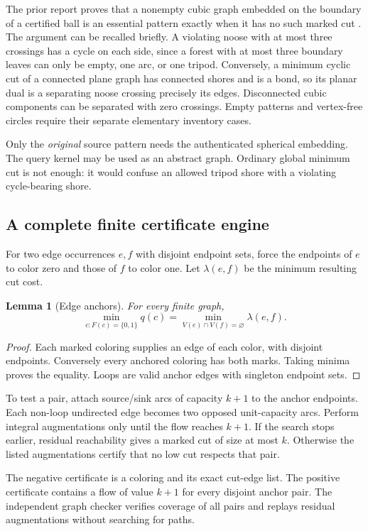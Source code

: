 \documentclass[11pt]{article}
\newtheorem{lemma}[theorem]{Lemma}
\theoremstyle{remark}\newtheorem{remark}[theorem]{Remark}
\begin{document}
The prior report proves that a nonempty cubic graph embedded on the boundary of a certified ball is an essential pattern exactly when it has no such marked cut \cite{fourcopy}. The argument can be recalled briefly. A violating noose with at most three crossings has a cycle on each side, since a forest with at most three boundary leaves can only be empty, one arc, or one tripod. Conversely, a minimum cyclic cut of a connected plane graph has connected shores and is a bond, so its planar dual is a separating noose crossing precisely its edges. Disconnected cubic components can be separated with zero crossings. Empty patterns and vertex-free circles require their separate elementary inventory cases.

Only the \emph{original} source pattern needs the authenticated spherical embedding. The query kernel may be used as an abstract graph. Ordinary global minimum cut is not enough: it would confuse an allowed tripod shore with a violating cycle-bearing shore.

\subsection{A complete finite certificate engine}
For two edge occurrences $e,f$ with disjoint endpoint sets, force the endpoints of $e$ to color zero and those of $f$ to color one. Let $\lambda(e,f)$ be the minimum resulting cut cost.
\begin{lemma}[Edge anchors]\label{lem:anchors}
For every finite graph,
\[
 \min_{c:F(c)=\{0,1\}}q(c)
 =\min_{V(e)\cap V(f)=\varnothing}\lambda(e,f).
\]
\end{lemma}
\begin{proof}
Each marked coloring supplies an edge of each color, with disjoint endpoints. Conversely every anchored coloring has both marks. Taking minima proves the equality. Loops are valid anchor edges with singleton endpoint sets.
\end{proof}
To test a pair, attach source/sink arcs of capacity $k+1$ to the anchor endpoints. Each non-loop undirected edge becomes two opposed unit-capacity arcs. Perform integral augmentations only until the flow reaches $k+1$. If the search stops earlier, residual reachability gives a marked cut of size at most $k$. Otherwise the listed augmentations certify that no low cut respects that pair.

The negative certificate is a coloring and its exact cut-edge list. The positive certificate contains a flow of value $k+1$ for every disjoint anchor pair. The independent graph checker verifies coverage of all pairs and replays residual augmentations without searching for paths.
\end{document}
